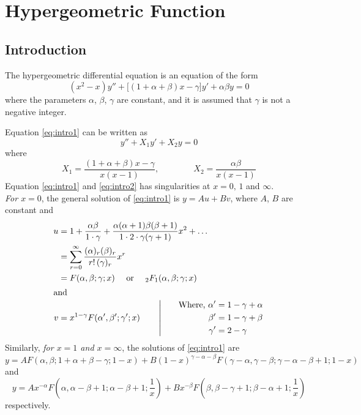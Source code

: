 \documentclass[../main-sheet.tex]{subfiles}
\begin{document}
\chapter{Hypergeometric Function}
\section{Introduction}
The hypergeometric differential equation is an equation of the form 
\begin{equation}
    \left( x^2-x \right)y''+\big[(1+\alpha+\beta)x-\gamma\big]y'+\alpha\beta y=0 \label{eq:intro1}
\end{equation}
where the parameters \( \alpha \), \( \beta \), \( \gamma \) are constant, and it is assumed that \( \gamma \) is not a negative integer.

Equation \eqref{eq:intro1} can be written as 
\begin{equation}
    y''+X_1y'+X_2y=0\label{eq:intro2}
\end{equation}
where
\[
    X_1=\frac{(1+\alpha+\beta)x-\gamma}{x(x-1)},\qquad\qquad X_2=\frac{\alpha \beta}{x(x-1)}
\]
Equation \eqref{eq:intro1} and \eqref{eq:intro2} has singularities at \( x=0,\,1 \) and \( \infty \).\\
\emph{For \( x=0 \)}, the general solution of \eqref{eq:intro1} is \( y=Au+Bv \), where \( A \), \( B \) are constant and
\begin{align*}
    u&=1+\frac{\alpha\beta}{1\cdot\gamma}+\frac{\alpha(\alpha+1)\beta(\beta+1)}{1\cdot2\cdot\gamma(\gamma+1)}x^2+\dots\\
    &=\sum_{r=0}^\infty \frac{(\alpha)_r (\beta)_r}{r!\,(\gamma)_r}x^r\\
    &=F(\alpha,\beta;\gamma;x) \quad\text{ or }\quad {}_2F_1(\alpha,\beta;\gamma;x)\\
    \intertext{and}
    v&=x^{1-\gamma}F(\alpha',\beta';\gamma';x)\qquad\left\vert\qquad\begin{aligned}
        \text{Where, } \alpha'&=1-\gamma+\alpha\\
        \beta'&=1-\gamma+\beta\\
        \gamma'&=2-\gamma
    \end{aligned}\right.
\end{align*}
Similarly, \emph{for \( x=1 \) and \( x=\infty \)}, the solutions of \eqref{eq:intro1} are
\[
    y=AF(\alpha,\beta;1+\alpha+\beta-\gamma;1-x)+B(1-x)^{\gamma-\alpha-\beta}F(\gamma-\alpha,\gamma-\beta;\gamma-\alpha-\beta+1;1-x)
\]
and 
\[
    y=Ax^{-\alpha}F\left(\alpha,\alpha-\beta+1;\alpha-\beta+1;\frac{1}{x}\right)+Bx^{-\beta}F\left(\beta,\beta-\gamma+1;\beta-\alpha+1;\frac{1}{x}\right)
\]
respectively.
\end{document}
